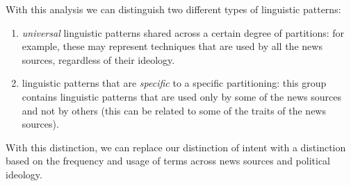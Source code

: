 With this analysis we can distinguish two different types of linguistic patterns:

\begin{enumerate}
    \item \emph{universal} linguistic patterns shared across a certain degree of partitions: for example, these may represent techniques that are used by all the news sources, regardless of their ideology.
    \item linguistic patterns that are \emph{specific} to a specific partitioning: this group contains linguistic patterns that are used only by some of the news sources and not by others (this can be related to some of the traits of the news sources).
\end{enumerate}

With this distinction, we can replace our distinction of intent with a distinction based on the frequency and usage of terms across news sources and political ideology.





